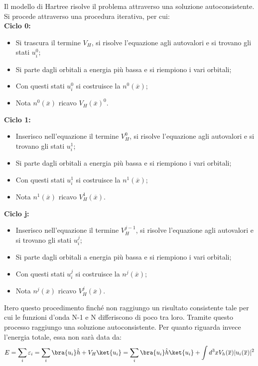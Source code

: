 Il modello di Hartree risolve il problema attraverso una soluzione autoconsistente. Si procede attraverso una procedura iterativa, per cui:
\\
\textbf{Ciclo 0:}
\begin{itemize}
    \item Si trascura il termine $V_H$, si risolve l'equazione agli autovalori e si trovano gli stati $u_i^0$;
    \item Si parte dagli orbitali a energia più bassa e si riempiono i vari orbitali;
    \item Con questi stati $u_i^0$ si costruisce la $n^0(\overline{x})$;
    \item Nota $n^0(\overline{x})$ ricavo $V_H(\overline x)^0$.
\end{itemize}
\textbf{Ciclo 1:}
\begin{itemize}
    \item Inserisco nell'equazione il termine $V_H^0$, si risolve l'equazione agli autovalori e si trovano gli stati $u_i^1$;
    \item Si parte dagli orbitali a energia più bassa e si riempiono i vari orbitali;
    \item Con questi stati $u_i^1$ si costruisce la $n^1(\overline{x})$;
    \item Nota $n^1(\overline{x})$ ricavo $V_H^1(\overline x)$.
\end{itemize}
\textbf{Ciclo j:}
\begin{itemize}
    \item Inserisco nell'equazione il termine $V_H^{j-1}$, si risolve l'equazione agli autovalori e si trovano gli stati $u_i^j$;
    \item Si parte dagli orbitali a energia più bassa e si riempiono i vari orbitali;
    \item Con questi stati $u_i^j$ si costruisce la $n^j(\overline{x})$;
    \item Nota $n^j(\overline{x})$ ricavo $V_H^j(\overline x)$.
\end{itemize}
Itero questo procedimento finché non raggiungo un risultato consistente tale per cui le funzioni d'onda N-1 e N differiscono di poco tra loro. Tramite questo processo raggiungo una soluzione autoconsistente.
Per quanto riguarda invece l'energia totale, essa non sarà data da:
\begin{equation*}
    E=\sum_i\varepsilon_i=\sum_i\bra{u_i}\hat h + V_H\ket{u_i}=\sum_i \bra{u_i}\hat h\ket{u_i}+\int d^3x V_h(\overline x)|u_i(\overline x)|^2
\end{equation*}
